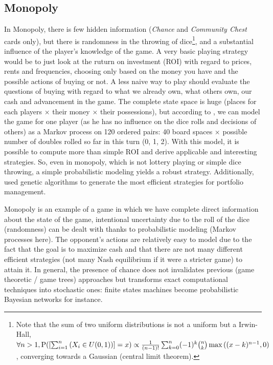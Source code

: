 \subsection{Monopoly}
In Monopoly, there is few hidden information (\textit{Chance} and \textit{Community Chest} cards only), but there is randomness in the throwing of dice\footnote{Note that the sum of two uniform distributions is not a uniform but a Irwin-Hall, $\forall n>1, \mathrm{P}([\sum_{i=1}^n{(X_i\in U(0,1))}]=x) \propto \frac{1}{(n-1)!}\sum_{k=0}^n(-1)^k{n\choose k}\max{((x-k)^{n-1},0)}$, converging towards a Gaussian (central limit theorem).}, and a substantial influence of the player's knowledge of the game. A very basic playing strategy would be to just look at the ruturn on investment (ROI) with regard to prices, rents and frequencies, choosing only based on the money you have and the possible actions of buying or not. A less naive way to play should evaluate the questions of buying with regard to what we already own, what others own, our cash and advancement in the game. The complete state space is huge (places for each players $\times$ their money $\times$ their possessions), but according to \cite{MonopolyMarkov}, we can model the game for one player (as he has no influence on the dice rolls and decisions of others) as a Markov process on 120 ordered pairs: 40 board spaces $\times$ possible number of doubles rolled so far in this turn (0, 1, 2). With this model, it is possible to compute more than simple ROI and derive applicable and interesting strategies. So, even in monopoly, which is not lottery playing or simple dice throwing, a simple probabilistic modeling yields a robust strategy. Additionally, \cite{MonopolyFrayn05} used genetic algorithms to generate the most efficient strategies for portfolio management. %

Monopoly is an example of a game in which we have complete direct information about the state of the game, intentional uncertainty due to the roll of the dice (randomness) can be dealt with thanks to probabilistic modeling (Markov processes here). The opponent's actions are relatively easy to model due to the fact that the goal is to maximize cash and that there are not many different efficient strategies (not many Nash equilibrium if it were a stricter game) to attain it. In general, the presence of chance does not invalidates previous (game theoretic / game trees) approaches but transforms exact computational techniques into stochastic ones: finite states machines become probabilistic Bayesian networks for instance.

